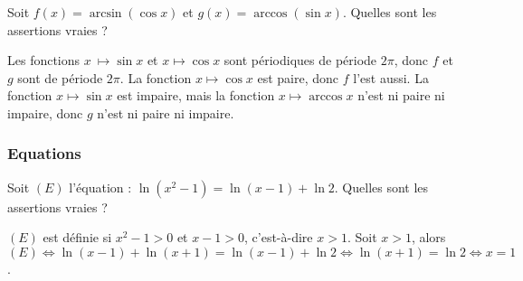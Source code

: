 \begin{question} 

Soit $f(x)=  \arcsin (\cos  x)$ et  $ g(x)= \arccos (\sin x) $. Quelles sont les assertions vraies ?
\begin{answers}



\end{answers}
\begin{explanations}
Les fonctions $x\ \mapsto   \sin x$ et $x  \mapsto  \cos  x$ sont périodiques de période $2\pi$, donc $f$ et $g$ sont de période $2\pi$. La fonction $x  \mapsto  \cos  x$  est paire, donc $f$ l'est aussi. La fonction $x  \mapsto  \sin   x$ est impaire, mais la fonction $x  \mapsto   \arccos  x$ n'est ni paire ni impaire, donc $g$ n'est ni paire ni impaire.
\end{explanations}

\end{question}



\subsubsection{Equations}



\begin{question}
 
Soit $(E)$ l'équation : $\ln (x^2-1) = \ln (x-1) + \ln 2$. Quelles sont les assertions vraies ?
\begin{answers}
    \bad{$(E)$ est définie sur  $]-\infty, -1[ \cup  ]1,+\infty[$.}

    \good{$(E)$ est définie sur  $]1,+\infty[$.}


\end{answers}
\begin{explanations}
$(E)$ est définie si $x^2-1>0$ et $x-1>0$, c'est-à-dire $x>1$. 
Soit $x>1$, alors $(E) \Leftrightarrow  \ln (x-1) + \ln (x+1)= \ln (x-1) + \ln 2  \Leftrightarrow  \ln (x+1)=  \ln 2 \Leftrightarrow  x=1$.
\end{explanations}

\end{question}


